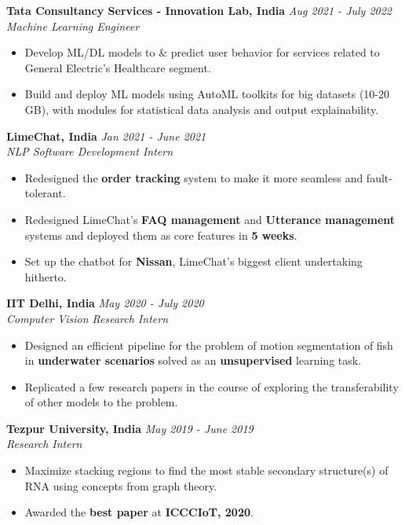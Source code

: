 \documentclass[10pt]{article}
\newenvironment{midlist}[1][\enskip\textbullet]%
        {\begin{itemize}[#1,leftmargin=*,parsep=0pt,itemsep=2pt,topsep=0pt,partopsep=0pt]}
        {\end{itemize}}
\begin{document}
\textbf{Tata Consultancy Services - Innovation Lab, India} \hfill {\textit{Aug 2021 - July 2022}}\\
\emph{Machine Learning Engineer}
\begin{midlist}
    \item Develop ML/DL models to \& predict user behavior for services related to General Electric’s Healthcare segment.
    \item Build and deploy ML models using AutoML toolkits for big datasets (10-20 GB), with modules for statistical data analysis and output explainability.
\end{midlist}
\vspace{2.5mm}

\textbf{LimeChat, India} \hfill {\textit{Jan 2021 - June 2021}}\\
\emph{NLP Software Development Intern}
\begin{midlist}
    \item Redesigned the \textbf{order tracking} system to make it more seamless and fault-tolerant.
    \item Redesigned LimeChat’s \textbf{FAQ management} and \textbf{Utterance management} systems and deployed them as core features in \textbf{5 weeks}.
    \item Set up the chatbot for \textbf{Nissan}, LimeChat’s biggest client undertaking hitherto.
\end{midlist}
\vspace{2.5mm}

\textbf{IIT Delhi, India} \hfill {\textit{May 2020 - July 2020}}\\
\emph{Computer Vision Research Intern}
\begin{midlist}
    \item Designed an efficient pipeline for the problem of motion segmentation of fish in \textbf{underwater scenarios} solved as an \textbf{unsupervised} learning task.
    \item Replicated a few research papers in the course of exploring the transferability of other models to the problem.
\end{midlist}
\vspace{2.5mm}

\textbf{Tezpur University, India} \hfill {\textit{May 2019 - June 2019}}\\
\emph{Research Intern}
\begin{midlist}
    \item Maximize stacking regions to find the most stable secondary structure(s) of RNA using concepts from graph theory.
    \item Awarded the \textbf{best paper} at \textbf{ICCCIoT, 2020}.
\end{midlist}
\vspace{1.2mm}
\end{document}
